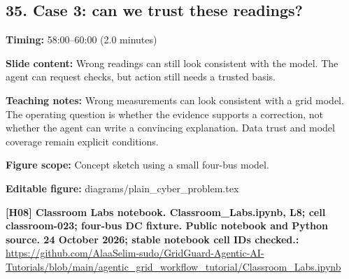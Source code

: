 \documentclass[10pt,letterpaper]{article}
\begin{document}
\subsection*{35. Case 3: can we trust these readings?}
\textbf{Timing:} 58:00--60:00 (2.0 minutes)\par
\textbf{Slide content:} Wrong readings can still look consistent with the model.
The agent can request checks, but action still needs a trusted basis.\par
\textbf{Teaching notes:} Wrong measurements can look consistent with a grid model. The operating question is whether the evidence supports a correction, not whether the agent can write a convincing explanation. Data trust and model coverage remain explicit conditions.\par
\textbf{Figure scope:} Concept sketch using a small four-bus model.\par
\textbf{Editable figure:} diagrams/plain\_cyber\_problem.tex\par
\textbf{[H08] Classroom Labs notebook. Classroom\_Labs.ipynb, L8; cell classroom-023; four-bus DC fixture. Public notebook and Python source. 24 October 2026; stable notebook cell IDs checked.:} \href{https://github.com/AlaaSelim-sudo/GridGuard-Agentic-AI-Tutorials/blob/main/agentic_grid_workflow_tutorial/Classroom_Labs.ipynb}{\small\ttfamily https:/\allowbreak{}/\allowbreak{}github.\allowbreak{}com/\allowbreak{}AlaaSelim-\allowbreak{}sudo/\allowbreak{}GridGuard-\allowbreak{}Agentic-\allowbreak{}AI-\allowbreak{}Tutorials/\allowbreak{}blob/\allowbreak{}main/\allowbreak{}agentic\_\allowbreak{}grid\_\allowbreak{}workflow\_\allowbreak{}tutorial/\allowbreak{}Classroom\_\allowbreak{}Labs.\allowbreak{}ipynb}\par
\par\medskip
\end{document}
